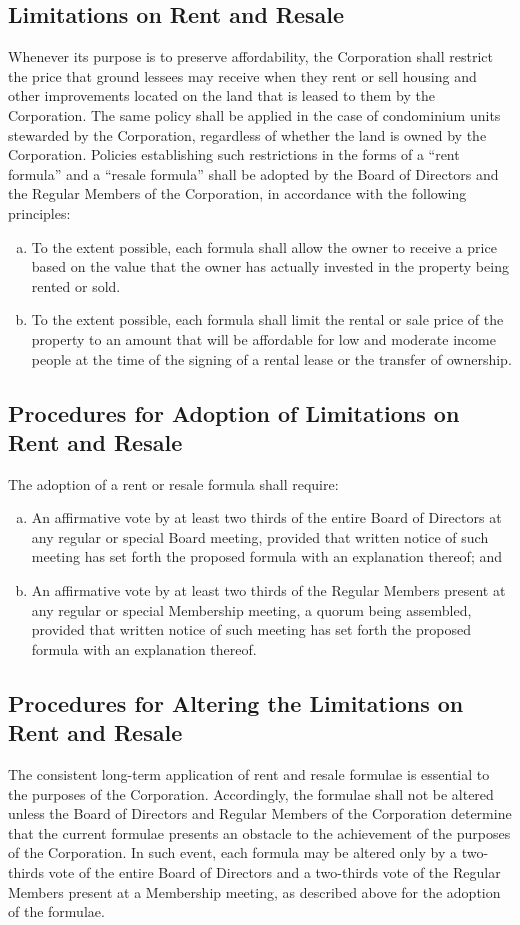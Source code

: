 \subsection{Limitations on Rent and Resale}
Whenever its purpose is to preserve affordability, the Corporation
shall restrict the price that ground lessees may receive when they
rent or sell housing and other improvements located on the land that
is leased to them by the Corporation. The same policy shall be applied
in the case of condominium units stewarded by the Corporation,
regardless of whether the land is owned by the Corporation. Policies
establishing such restrictions in the forms of a ``rent formula'' and
a ``resale formula'' shall be adopted by the Board of Directors and
the Regular Members of the Corporation, in accordance with the
following principles:
\begin{enumerate}[a.]
\item To the extent possible, each formula shall allow the owner to
  receive a price based on the value that the owner has actually
  invested in the property being rented or sold.
\item To the extent possible, each formula shall limit the rental or
  sale price of the property to an amount that will be affordable for
  low and moderate income people at the time of the signing of a
  rental lease or the transfer of ownership.
\end{enumerate}

\subsection{Procedures for Adoption of Limitations on Rent and Resale}
The adoption of a rent or resale formula shall require:
\begin{enumerate}[a.]
\item An affirmative vote by at least two thirds of the entire Board
  of Directors at any regular or special Board meeting, provided that
  written notice of such meeting has set forth the proposed formula
  with an explanation thereof; and
\item An affirmative vote by at least two thirds of the Regular
  Members present at any regular or special Membership meeting, a
  quorum being assembled, provided that written notice of such meeting
  has set forth the proposed formula with an explanation thereof.
\end{enumerate}

\subsection{Procedures for Altering the Limitations on Rent and Resale}
The consistent long-term application of rent and resale formulae is
essential to the purposes of the Corporation. Accordingly, the
formulae shall not be altered unless the Board of Directors and
Regular Members of the Corporation determine that the current formulae
presents an obstacle to the achievement of the purposes of the
Corporation. In such event, each formula may be altered only by a
two-thirds vote of the entire Board of Directors and a two-thirds vote
of the Regular Members present at a Membership meeting, as described
above for the adoption of the formulae.

